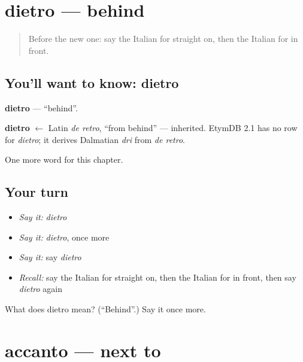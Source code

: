 \section[dietro]{dietro — behind}

\label{lesson:IT-C91-dietro}



\begin{quote}
Before the new one: say the Italian for straight on, then the Italian for in front.
\end{quote}

\subsection*{You'll want to know: dietro}
\textbf{dietro} — \textquotedblleft{}behind\textquotedblright{}.

\begin{cousinweb}
\textbf{dietro} $\leftarrow$ Latin \emph{de retro}, \textquotedblleft{}from behind\textquotedblright{} — inherited. EtymDB 2.1 has no row for \emph{dietro}; it derives Dalmatian \emph{dri} from \emph{de retro}.
\end{cousinweb}

\begin{grammarlens}[title={What you've built}]
One more word for this chapter.
\end{grammarlens}

\subsection*{Your turn}
\begin{itemize}
\raggedright
  \item \emph{Say it:} \emph{dietro}
  \item \emph{Say it:} \emph{dietro}, once more
  \item \emph{Say it:} say \emph{dietro}
  \item \emph{Recall:} say the Italian for straight on, then the Italian for in front, then say \emph{dietro} again
\end{itemize}

\begin{tcolorbox}[breakable,colback=teal!4,colframe=teal!35!black,title={Before you move on}]
What does dietro mean? (\textquotedblleft{}Behind\textquotedblright{}.) Say it once more.
\end{tcolorbox}
\section[accanto]{accanto — next to}

